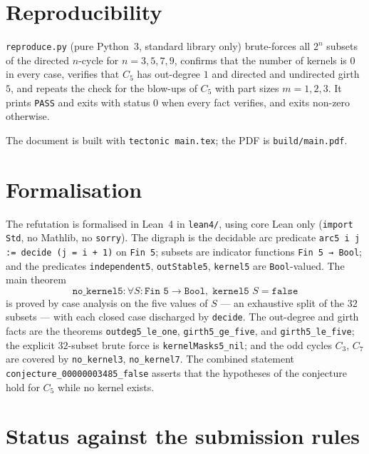 \documentclass[11pt]{article}
\theoremstyle{definition}
\theoremstyle{remark}
\newcommand{\Cfive}{C_5}
\begin{document}
\section{Reproducibility}

\texttt{reproduce.py} (pure Python~3, standard library only) brute-forces all
$2^n$ subsets of the directed $n$-cycle for $n = 3, 5, 7, 9$, confirms that the
number of kernels is $0$ in every case, verifies that $\Cfive$ has out-degree
$1$ and directed and undirected girth $5$, and repeats the check for the
blow-ups of $\Cfive$ with part sizes $m = 1, 2, 3$. It prints \texttt{PASS} and
exits with status $0$ when every fact verifies, and exits non-zero otherwise.

The document is built with \texttt{tectonic main.tex}; the PDF is
\texttt{build/main.pdf}.

\section{Formalisation}

The refutation is formalised in Lean~4 in \texttt{lean4/}, using core Lean only
(\texttt{import Std}, no Mathlib, no \texttt{sorry}). The digraph is the
decidable arc predicate \texttt{arc5 i j := decide (j = i + 1)} on
\texttt{Fin 5}; subsets are indicator functions \texttt{Fin 5 → Bool}; and the
predicates \texttt{independent5}, \texttt{outStable5}, \texttt{kernel5} are
\texttt{Bool}-valued. The main theorem
\[
\texttt{no\_kernel5} : \forall S : \texttt{Fin 5} \to \texttt{Bool},\;
\texttt{kernel5 } S = \texttt{false}
\]
is proved by case analysis on the five values of $S$ --- an exhaustive split of
the $32$ subsets --- with each closed case discharged by \texttt{decide}. The
out-degree and girth facts are the theorems \texttt{outdeg5\_le\_one},
\texttt{girth5\_ge\_five}, and \texttt{girth5\_le\_five}; the explicit
$32$-subset brute force is \texttt{kernelMasks5\_nil}; and the odd cycles
$C_3$, $C_7$ are covered by \texttt{no\_kernel3}, \texttt{no\_kernel7}. The
combined statement \texttt{conjecture\_00000003485\_false} asserts that the
hypotheses of the conjecture hold for $\Cfive$ while no kernel exists.

\section{Status against the submission rules}
\end{document}
